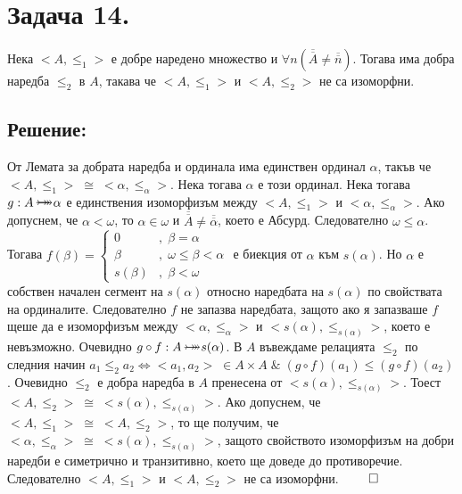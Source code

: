 \documentclass[12pt]{article}
\newcommand{\bijection}[0]{\mathbin{\mathlarger{\mathlarger{\rightarrowtail}} \hspace{-14pt} \mathlarger{\mathlarger{\twoheadrightarrow}}}}
\begin{document}
\section*{Задача 14.}
Нека \(<A, \leq_1>\) е добре наредено множество и \(\forall n (\overline{\overline{A}} \neq \overline{\overline{n}})\). Тогава има добра наредба \(\leq_2\) в \(A\),
такава че \(<A, \leq_1>\) и \(<A, \leq_2>\) не са изоморфни.

\subsection*{Решение:}
От Лемата за добрата наредба и ординала има единствен ординал \(\alpha\),
такъв че \\
\(<A, \leq_1> \; \cong \; <\alpha, \leq_\alpha>\).
Нека тогава \(\alpha\) е този ординал.
Нека тогава \\
\(g : A \bijection \alpha\) е единствения изоморфизъм между \(<A, \leq_1>\) и \(<\alpha, \leq_\alpha>\).
Ако допуснем, че \(\alpha < \omega\), то \(\alpha \in \omega\)
и \(\overline{\overline{A}} \neq \overline{\overline{\alpha}}\),
което е Абсурд. Следователно \(\omega \leq \alpha\).
Тогава \(f(\beta) = \begin{cases}
 0 & , \; \beta = \alpha \\
 \beta & , \; \omega \leq \beta < \alpha \\
 s(\beta) & , \; \beta < \omega
\end{cases}\)
\quad е биекция от \(\alpha\) към \(s(\alpha)\).
Но \(\alpha\) е собствен начален сегмент на \(s(\alpha)\)
относно наредбата на \(s(\alpha)\) по свойствата на ординалите.
Следователно \(f\) не запазва наредбата, защото ако я запазваше
\(f\) щеше да е изоморфизъм между \(<\alpha, \leq_\alpha>\) и \(<s(\alpha), \leq_{s(\alpha)}>\), което е невъзможно. 
Очевидно \(g \circ f : A \bijection s(\alpha)\).
В \(A\) въвеждаме релацията \(\leq_2\) по следния начин
\(a_1 \leq_2 a_2 \iff <a_1, a_2> \; \in A \times A \; \& \; (g \circ f)(a_1) \leq (g \circ f)(a_2)\).
Очевидно \(\leq_2\) е добра наредба в \(A\) пренесена от \(<s(\alpha), \leq_{s(\alpha)}>\).
Тоест \(<A, \leq_2> \; \cong \; <s(\alpha), \leq_{s(\alpha)}>\).
Ако допуснем, че \(<A, \leq_1> \; \cong \; <A, \leq_2>\),
то ще получим, че \(<\alpha, \leq_\alpha> \; \cong \; <s(\alpha), \leq_{s(\alpha)}>\),
защото свойството изоморфизъм на добри наредби е симетрично и транзитивно,
което ще доведе до противоречие.
Следователно \(<A, \leq_1>\) и \(<A, \leq_2>\) не са изоморфни. \(\qed\)
\end{document}
